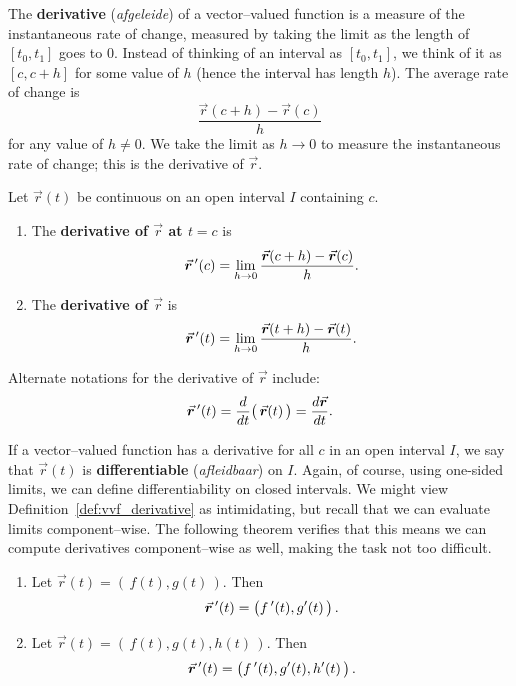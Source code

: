 The \textbf{derivative} (\textit{afgeleide}) of a vector--valued function is a measure of the instantaneous rate of change, measured by taking the limit as the length of $[t_0,t_1]$ goes to 0. Instead of thinking of an interval as $[t_0,t_1]$, we think of it as $[c,c+h]$ for some value of $h$ (hence the interval has length $h$).  The average rate of change is 
$$\frac{\vec r(c+h)-\vec r(c)}{h}$$ for any value of $h\neq0$. We take the limit as $h\to0$ to measure the instantaneous rate of change; this is the derivative of $\vec r$.


\begin{definition}\label{def:vvf_derivative}
Let $\vec r(t)$ be continuous on an open interval $I$ containing $c$.
\begin{enumerate}
	\item The \textbf{derivative of $\vec r$ at $t=c$} is
	$$ \vrp (c) = \lim_{h\to 0} \frac{\vec r(c+h) - \vec r(c)}{h}.$$
	\item	The \textbf{derivative of $\vec r$} is
	$$ \vrp (t) = \lim_{h\to 0} \frac{\vec r(t+h) - \vec r(t)}{h}.$$
\end{enumerate}
\end{definition}

Alternate notations for the derivative of $\vec r$ include: $$\vrp(t) = \frac{d}{dt}\big(\,\vec r(t)\,\big) = \frac{d\vec r}{dt}.$$




If a vector--valued function  has a derivative for all $c$ in an open interval $I$, we say that $\vec r(t)$ is \textbf{differentiable} (\textit{afleidbaar}) on $I$. Again, of course,  using one-sided limits, we can define differentiability on closed intervals. We might view Definition~\ref{def:vvf_derivative} as intimidating, but recall that we can evaluate limits component--wise. The following theorem verifies that this means we can compute derivatives component--wise as well, making the task not too difficult.

\ifcalculus
\begin{theorem}\label{thm:vvf_deriv}
\begin{enumerate}
	\item Let $\vec r(t) = \left( \, f(t), g(t)\,\right)$. Then 
	$$\vrp(t) = \left( \fp(t), g'(t)\, \right).$$
	\item Let $\vec r(t) = \left( \, f(t), g(t), h(t)\,\right)$. Then
	$$\vrp(t) = \left( \fp(t), g'(t), h'(t)\, \right).$$
\end{enumerate}
\end{theorem}
\fi

